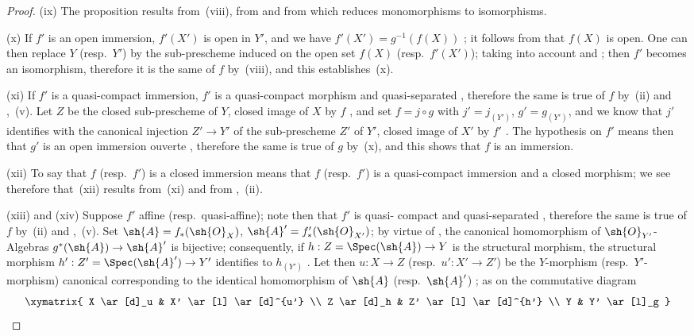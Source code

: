 \begin{proof}
(ix) The proposition results from~(viii), from  and from  which reduces
monomorphisms to isomorphisms.

(x) If $f'$ is an open immersion, $f'(X')$ is open in $Y'$, and we have
$f'(X')=g^{-1}(f(X))$ ; it follows from  that $f(X)$ is open. One can then
replace $Y$ (resp.\ $Y'$) by the sub-prescheme induced on the open set $f(X)$ (resp.\ $f'(X')$);
taking into account  and ; then $f'$ becomes an isomorphism, therefore it is the same
of $f$ by~(viii), and this establishes~(x).


(xi) If $f'$ is a quasi-compact immersion, $f'$ is a quasi-compact
morphism and quasi-separated , therefore the same is true of $f$ by~(ii) and ,~(v). Let $Z$ be the
closed sub-prescheme of $Y$, closed image of $X$ by $f$ , and set $f=j\circ g$ with $j'=j_{(Y')}$, $g'=g_{(Y')}$,
and we know that $j'$
identifies with the canonical injection $Z'\to Y'$ of the sub-prescheme $Z'$ of $Y'$, closed image
of $X'$ by $f'$ . The hypothesis on $f'$ means then that $g'$ is an open immersion
ouverte , therefore the same is true of $g$ by~(x), and this shows that $f$ is an
immersion.

(xii) To say that $f$ (resp.\ $f'$) is a closed immersion means that $f$ (resp.\ $f'$) is a quasi-compact
immersion and a closed morphism; we see therefore that~(xii) results from~(xi)
and from ,~(ii).

(xiii) and (xiv) Suppose $f'$ affine (resp.\ quasi-affine); note then that $f'$ is quasi-
compact and quasi-separated , therefore the same is true of $f$ by~(ii) and ,~(v).
Set $\sh{A}=f_*(\sh{O}_X)$, $\sh{A}'=f'_*(\sh{O}_{X'})$; by virtue of , the canonical homomorphism
of $\sh{O}_{Y'}$-Algebras $g^*(\sh{A})\to\sh{A}'$ is bijective; consequently, if $h:Z=\Spec(\sh{A})\to Y$ is
the structural morphism, the structural morphism $h':Z'=\Spec(\sh{A}')\to Y'$ identifies
to $h_{(Y')}$ . Let then $u:X\to Z$ (resp.\ $u':X'\to Z'$) be the $Y$-morphism (resp.\
$Y'$-morphism) canonical corresponding to the identical homomorphism of $\sh{A}$ (resp.\ $\sh{A}'$)
\sref[II]{II.1.2.7}; as on the commutative diagram
\[
\xymatrix{
  X \ar[d]_u & X' \ar[l] \ar[d]^{u'} \\
  Z \ar[d]_h & Z' \ar[l] \ar[d]^{h'} \\
  Y & Y' \ar[l]_g
}
\]


\end{proof}
